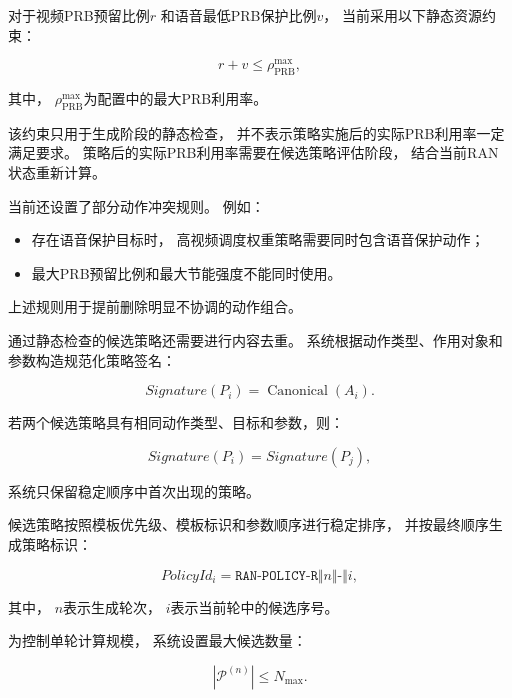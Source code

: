 \documentclass[lang=cn,12pt]{elegantbook}
\begin{document}
对于视频PRB预留比例$r$
和语音最低PRB保护比例$v$，
当前采用以下静态资源约束：

\begin{equation}
r+v
\leq
\rho_{\mathrm{PRB}}^{\max},
\label{eq:static_prb_constraint_reduced}
\end{equation}

其中，
$\rho_{\mathrm{PRB}}^{\max}$为配置中的最大PRB利用率。

该约束只用于生成阶段的静态检查，
并不表示策略实施后的实际PRB利用率一定满足要求。
策略后的实际PRB利用率需要在候选策略评估阶段，
结合当前RAN状态重新计算。

当前还设置了部分动作冲突规则。
例如：

\begin{itemize}
    \item 存在语音保护目标时，
    高视频调度权重策略需要同时包含语音保护动作；
    \item 最大PRB预留比例和最大节能强度不能同时使用。
\end{itemize}

上述规则用于提前删除明显不协调的动作组合。

通过静态检查的候选策略还需要进行内容去重。
系统根据动作类型、作用对象和参数构造规范化策略签名：

\begin{equation}
Signature(P_i)
=
\operatorname{Canonical}
\left(
A_i
\right).
\label{eq:policy_signature_reduced}
\end{equation}

若两个候选策略具有相同动作类型、目标和参数，则：

\begin{equation}
Signature(P_i)
=
Signature(P_j),
\label{eq:duplicate_policy_reduced}
\end{equation}

系统只保留稳定顺序中首次出现的策略。

候选策略按照模板优先级、模板标识和参数顺序进行稳定排序，
并按最终顺序生成策略标识：

\begin{equation}
PolicyId_i
=
\texttt{RAN-POLICY-R}
\Vert n
\Vert
\texttt{-}
\Vert i,
\label{eq:policy_identifier_reduced}
\end{equation}

其中，
$n$表示生成轮次，
$i$表示当前轮中的候选序号。

为控制单轮计算规模，
系统设置最大候选数量：

\begin{equation}
\left|
\mathcal{P}^{(n)}
\right|
\leq
N_{\max}.
\label{eq:maximum_policy_count_reduced}
\end{equation}
\end{document}
